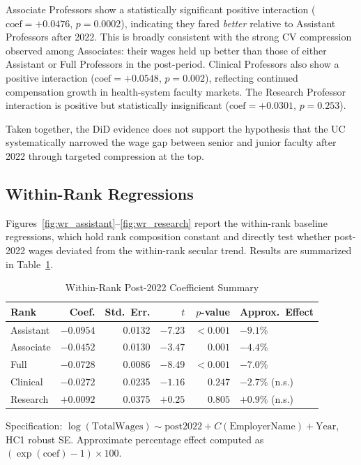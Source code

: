 \documentclass[12pt]{article}
\begin{document}
Associate Professors show a statistically significant positive
interaction ($\text{coef} = +0.0476$, $p = 0.0002$), indicating they
fared \emph{better} relative to Assistant Professors after 2022. This
is broadly consistent with the strong CV compression observed among
Associates: their wages held up better than those of either Assistant or
Full Professors in the post-period. Clinical Professors also show a
positive interaction ($\text{coef} = +0.0548$, $p = 0.002$), reflecting
continued compensation growth in health-system faculty markets. The
Research Professor interaction is positive but statistically
insignificant ($\text{coef} = +0.0301$, $p = 0.253$).

Taken together, the DiD evidence does not support the hypothesis that
the UC systematically narrowed the wage gap between senior and junior
faculty after 2022 through targeted compression at the top.

\subsection{Within-Rank Regressions}
\label{subsec:withinrank}

Figures~\ref{fig:wr_assistant}--\ref{fig:wr_research} report the
within-rank baseline regressions, which hold rank composition constant
and directly test whether post-2022 wages deviated from the within-rank
secular trend. Results are summarized in Table~\ref{tab:within_rank}.

\begin{table}[H]
\centering
\caption{Within-Rank Post-2022 Coefficient Summary}
\label{tab:within_rank}
\begin{tabular}{lrrrrl}
\toprule
Rank & Coef. & Std.\ Err. & $t$ & $p$-value & Approx.\ Effect \\
\midrule
Assistant  & $-0.0954$ & 0.0132 & $-7.23$ & $<0.001$ & $-9.1\%$ \\
Associate  & $-0.0452$ & 0.0130 & $-3.47$ & $0.001$  & $-4.4\%$ \\
Full       & $-0.0728$ & 0.0086 & $-8.49$ & $<0.001$ & $-7.0\%$ \\
Clinical   & $-0.0272$ & 0.0235 & $-1.16$ & $0.247$  & $-2.7\%$ (n.s.) \\
Research   & $+0.0092$ & 0.0375 & $+0.25$ & $0.805$  & $+0.9\%$ (n.s.) \\
\bottomrule
\end{tabular}
\begin{flushleft}
\small Specification: $\log(\text{TotalWages}) \sim
\text{post2022} + C(\text{EmployerName}) + \text{Year}$, HC1 robust
SE. Approximate percentage effect computed as $(\exp(\text{coef})-1)
\times 100$.
\end{flushleft}
\end{table}
\end{document}
